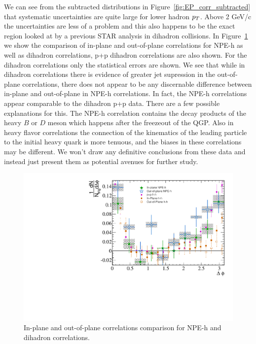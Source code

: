 We can see from the subtracted distributions in Figure~\ref{fig:EP_corr_subtracted} that systematic uncertainties are quite large for lower hadron $p_{T}$. Above 2 GeV/c the uncertainties are less of a problem and this also happens to be the exact region looked at by a previous STAR analysis in dihadron collisions. In Figure~\ref{fig:EP_comparison} we show the comparison of in-plane and out-of-plane correlations for NPE-h as well as dihadron correlations, p+p dihadron correlations are also shown. For the dihadron correlations only the statistical errors are shown. We see that while in dihadron correlations there is evidence of greater jet supression in the out-of-plane correlations, there does not appear to be any discernable difference between in-plane and out-of-plane in NPE-h correlations. In fact, the NPE-h correlations appear comparable to the dihadron p+p data. There are a few possible explanations for this. The NPE-h correlation contains the decay products of the heavy $B$ or $D$ meson which happens after the freezeout of the QGP. Also in heavy flavor correlations the connection of the kinematics of the leading particle to the initial heavy quark is more tenuous, and the biases in these correlations may be different. We won't draw any definitive conclusions from these data and instead just present them as potential avenues for further study.

\begin{figure}[htbp]
\begin{center}
\includegraphics[scale=.8]{Plots/Correlations/EP/NPE_subtracted_eh_corr_in-out_comp_with_pub_primpt_4_5_cent_2_5_assopt_3_4.pdf}
\end{center}
\caption[Event Plane Dependent Correlation Comparison]{In-plane and out-of-plane correlations comparison for NPE-h and dihadron correlations.}
\label{fig:EP_comparison}
\end{figure}

